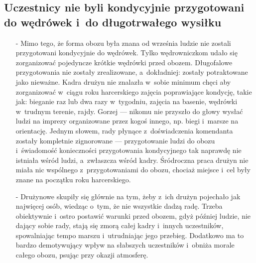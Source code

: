 \subsection{Uczestnicy nie byli kondycyjnie przygotowani do wędrówek i~do długotrwałego wysiłku}
\begin{itemize}
\item[-] Mimo tego, że forma obozu była znana od września ludzie nie zostali przygotowani kondycyjnie do wędrówek. Tylko wędrowniczkom udało się zorganizować pojedyncze krótkie wędrówki przed obozem. Długofalowe przygotowania nie zostały zrealizowane, a~dokładniej: zostały potraktowane jako nieważne. Kadra drużyn nie znalazła w~sobie minimum chęci aby zorganizować w~ciągu roku harcerskiego zajęcia poprawiające kondycję, takie jak: bieganie raz lub dwa razy w~tygodniu, zajęcia na basenie, wędrówki w~trudnym terenie, rajdy. Gorzej --- nikomu nie przyszło do głowy wysłać ludzi na imprezy organizowane przez kogoś innego, np. biegi i~marsze na orientację. Jednym słowem, rady płynące z~doświadczenia komendanta zostały kompletnie zignorowane --- przygotowanie ludzi do obozu i~świadomość konieczności przygotowania kondycyjnego tak naprawdę nie istniała wśród ludzi, a~zwłaszcza wśród kadry. Śródroczna praca drużyn nie miała nic wspólnego z~przygotowaniami do obozu, chociaż miejsce i~cel były znane na początku roku harcerskiego.
\item[-] Drużynowe skupiły się głównie na tym, żeby z~ich drużyn pojechało jak najwięcej osób, wiedząc o~tym, że nie wszystkie dadzą radę. Trzeba obiektywnie i~ostro postawić warunki przed obozem, gdyż później ludzie, nie dający sobie rady, stają się zmorą całej kadry i~innych uczestników, spowalniając tempo marszu i~utrudniając jego przebieg. Dodatkowo ma to bardzo demotywujący wpływ na słabszych uczestników i~obniża morale całego obozu, psując przy okazji atmosferę.
\end{itemize}